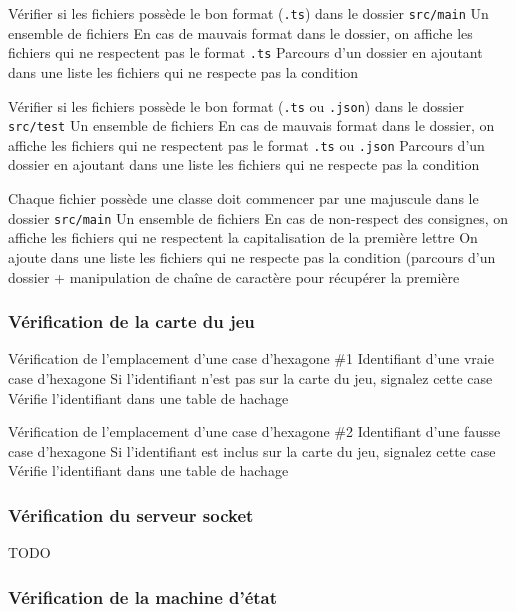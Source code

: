 \mytest
{Vérifier si les fichiers possède le bon format (\texttt{.ts}) dans le dossier \texttt{src/main}}
{Un ensemble de fichiers}
{En cas de mauvais format dans le dossier, on affiche les fichiers qui ne respectent pas le format \texttt{.ts}}
{Parcours d'un dossier en ajoutant dans une liste les fichiers qui ne respecte pas la condition}

\mytest
{Vérifier si les fichiers possède le bon format (\texttt{.ts} ou \texttt{.json}) dans le dossier \texttt{src/test}}
{Un ensemble de fichiers}
{En cas de mauvais format dans le dossier, on affiche les fichiers qui ne respectent pas le format \texttt{.ts} ou \texttt{.json}}
{Parcours d'un dossier en ajoutant dans une liste les fichiers qui ne respecte pas la condition}

\mytest
{Chaque fichier possède une classe doit commencer par une majuscule dans le dossier \texttt{src/main}}
{Un ensemble de fichiers}
{En cas de non-respect des consignes, on affiche les fichiers qui ne respectent la capitalisation de la première lettre}
{On ajoute dans une liste les fichiers qui ne respecte pas la condition (parcours d'un dossier + manipulation de chaîne de caractère pour récupérer la première}

\subsubsection{Vérification de la carte du jeu}

\mytest
{Vérification de l'emplacement d'une case d'hexagone \#1}
{Identifiant d'une vraie case d'hexagone}
{Si l'identifiant n'est pas sur la carte du jeu, signalez cette case}
{Vérifie l'identifiant dans une table de hachage}

\mytest
{Vérification de l'emplacement d'une case d'hexagone \#2}
{Identifiant d'une fausse case d'hexagone}
{Si l'identifiant est inclus sur la carte du jeu, signalez cette case}
{Vérifie l'identifiant dans une table de hachage}

\subsubsection{Vérification du serveur socket}

TODO

\subsubsection{Vérification de la machine d'état}

